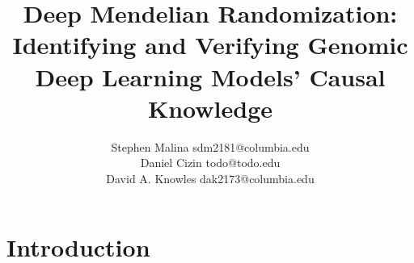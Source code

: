 \documentclass[twoside,11pt]{article}
\begin{document}
\title{Deep Mendelian Randomization: Identifying and Verifying Genomic Deep Learning Models' Causal Knowledge}

\author{\name Stephen Malina \email sdm2181@columbia.edu \\
       \AND
	\name Daniel Cizin \email todo@todo.edu \\
       \AND
       \name David A. Knowles \email dak2173@columbia.edu}
       


\maketitle

\section{Introduction}
\end{document}

